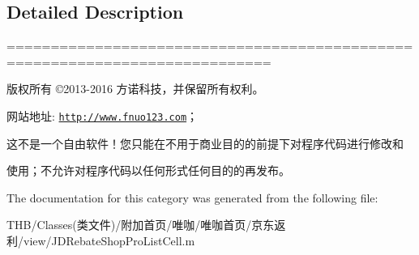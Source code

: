 \subsection{Detailed Description}
============================================================================

版权所有 ©2013-\/2016 方诺科技，并保留所有权利。

网站地址\+: \href{http://www.fnuo123.com}{\tt http\+://www.\+fnuo123.\+com}； 



这不是一个自由软件！您只能在不用于商业目的的前提下对程序代码进行修改和

使用；不允许对程序代码以任何形式任何目的的再发布。 

 

The documentation for this category was generated from the following file\+:\begin{DoxyCompactItemize}
\item 
T\+H\+B/\+Classes(类文件)/附加首页/唯咖/唯咖首页/京东返利/view/J\+D\+Rebate\+Shop\+Pro\+List\+Cell.\+m\end{DoxyCompactItemize}
